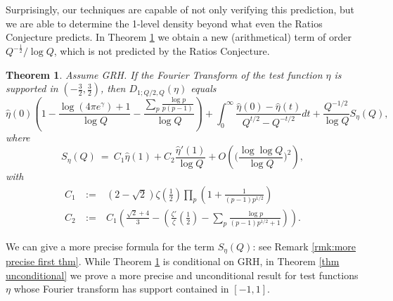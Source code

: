 \documentclass[12pt,reqno]{amsart}
\numberwithin{equation}{section}
\theoremstyle{plain}
\newtheorem{theorem}[thm]{Theorem}
\begin{document}
Surprisingly, our techniques are capable of not only verifying this prediction, but we are able to determine the 1-level density beyond what even the Ratios Conjecture predicts. In Theorem \ref{first thm} we obtain a new (arithmetical) term of order $Q^{-\frac 12}/\log Q$, which is not predicted by the Ratios Conjecture.

\begin{theorem}\label{first thm} Assume GRH.
If the Fourier Transform of the test function $\eta$ is supported in $(-\frac 32, \frac 32)$, then $D_{1;Q/2,Q}(\eta)$ equals
\begin{equation}
\widehat{\eta}(0) \left( 1 -\frac{\log(4\pi e^{\gamma})+1}{\log Q} - \frac{\sum_p \frac{\log p}{p(p-1)} }{\log Q}\right)+\int_0^{\infty}\frac{\widehat{\eta}(0)-\widehat{\eta}(t)}{Q^{t/2}-Q^{-t/2}} dt + \frac{Q^{-1/2}}{\log Q}S_{\eta}(Q),
 \label{equation 3/2 2}
\end{equation}
where
\begin{equation} S_{\eta}(Q)\ = \ C_1 \widehat{\eta}(1) + C_2 \frac{\widehat{\eta}'(1)}{\log Q} +  O\left(  \Big(\frac {\log\log Q}{\log Q} \Big)^2\right),\end{equation}
with
\begin{eqnarray} C_1 & \ :=\ & (2-\sqrt 2) \zeta\left( \frac 12\right) \prod_p \left( 1+\frac 1{(p-1)p^{1/2}}\right) \nonumber\\
 C_2 & \ :=\ &  C_1  \left(\frac{\sqrt 2+4}3 -\left( \frac{\zeta'}{\zeta} \left(\frac 12\right) -\sum_p \frac{\log p}{(p-1)p^{1/2}+1}\right) \right).\end{eqnarray}

\end{theorem}
We can give a more precise formula for the term $S_{\eta}(Q)$: see Remark \ref{rmk:more precise first thm}. While Theorem \ref{first thm} is conditional on GRH, in Theorem \ref{thm unconditional} we prove a more precise and unconditional result for test functions $\eta$ whose Fourier transform has support contained in $[-1,1]$.
\end{document}
